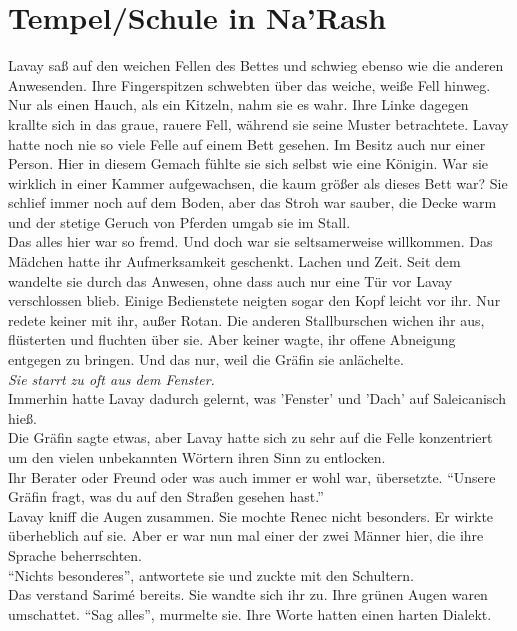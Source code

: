 \chapter{Tempel/Schule in Na'Rash}

Lavay saß auf den weichen Fellen des Bettes und schwieg ebenso wie die anderen Anwesenden. Ihre 
Fingerspitzen schwebten über das weiche, weiße Fell hinweg. Nur als einen Hauch, als ein Kitzeln, 
nahm sie es wahr. Ihre Linke dagegen krallte sich in das graue, rauere Fell, während sie seine 
Muster betrachtete. Lavay hatte noch nie so viele Felle auf einem Bett gesehen. Im Besitz auch nur 
einer Person. Hier in diesem Gemach fühlte sie sich selbst wie eine Königin. War sie wirklich in 
einer Kammer aufgewachsen, die kaum größer als dieses Bett war? Sie schlief immer noch auf dem 
Boden, aber das Stroh war sauber, die Decke warm und der stetige Geruch von Pferden umgab sie im 
Stall.\\
Das alles hier war so fremd. Und doch war sie seltsamerweise willkommen. Das Mädchen hatte ihr 
Aufmerksamkeit geschenkt. Lachen und Zeit. Seit dem wandelte sie durch das Anwesen, ohne dass auch 
nur eine Tür vor Lavay verschlossen blieb. Einige Bedienstete neigten sogar den Kopf leicht vor 
ihr. Nur redete keiner mit ihr, außer Rotan. Die anderen Stallburschen wichen ihr aus, flüsterten 
und fluchten über sie. Aber keiner wagte, ihr offene Abneigung entgegen zu bringen. Und das nur, 
weil die Gräfin sie anlächelte.\\
\textit{Sie starrt zu oft aus dem Fenster.}\\
Immerhin hatte Lavay dadurch gelernt, was 'Fenster' und 'Dach' auf Saleicanisch hieß.\\
Die Gräfin sagte etwas, aber Lavay hatte sich zu sehr auf die Felle konzentriert um den vielen 
unbekannten Wörtern ihren Sinn zu entlocken.\\
Ihr Berater oder Freund oder was auch immer er wohl war, übersetzte. ``Unsere Gräfin fragt, was du 
auf den Straßen gesehen hast.''\\
Lavay kniff die Augen zusammen. Sie mochte Renec nicht besonders. Er wirkte überheblich auf sie. 
Aber er war nun mal einer der zwei Männer hier, die ihre Sprache beherrschten.\\
``Nichts besonderes'', antwortete sie und zuckte mit den Schultern.\\
Das verstand Sarimé bereits. Sie wandte sich ihr zu. Ihre grünen Augen waren umschattet. ``Sag 
alles'', murmelte sie. Ihre Worte hatten einen harten Dialekt.\\
